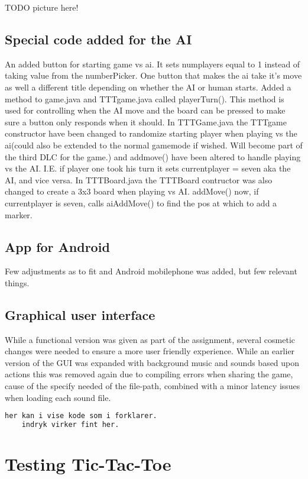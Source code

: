 \documentclass[a4paper,10pt]{article}
\begin{document}
TODO picture here!

\subsection{Special code added for the AI}
An added button for starting game vs ai. It sets numplayers equal to 1 instead of taking value from the numberPicker.
One button that makes the ai take it's move as well a different title depending on whether the AI or human starts.
Added a method to game.java and TTTgame.java called playerTurn(). This method is used for controlling when the AI move and the board can be pressed to make sure a button only responds when it should.
In TTTGame.java the TTTgame constructor have been changed to randomize starting player when playing vs the ai(could also be extended to the normal gamemode if wished. Will become part of the third DLC for the game.) and addmove() have been altered to handle playing vs the AI. I.E. if player one took his turn it sets currentplayer = seven aka the AI, and vice versa.
In TTTBoard.java the TTTBoard contructor was also changed to create a 3x3 board when playing vs AI. addMove() now, if currentplayer is seven, calls aiAddMove() to find the pos at which to add a marker.


\subsection{App for Android}
Few adjustments as to fit and Android mobilephone was added, but few relevant things.
\subsection{Graphical user interface}
While a functional version was given as part of the assignment, several cosmetic changes were needed to ensure a more user friendly experience. While an earlier version of the GUI was expanded with background music and sounds based upon actions this was removed again due to compiling errors when sharing the game, cause of the specify needed of the file-path, combined with a minor latency issues when loading each sound file.
	
	\begin{lstlisting}[language=python]
	her kan i vise kode som i forklarer.
	indryk virker fint her.
	\end{lstlisting}
	
	
	\section{Testing Tic-Tac-Toe}
\end{document}
